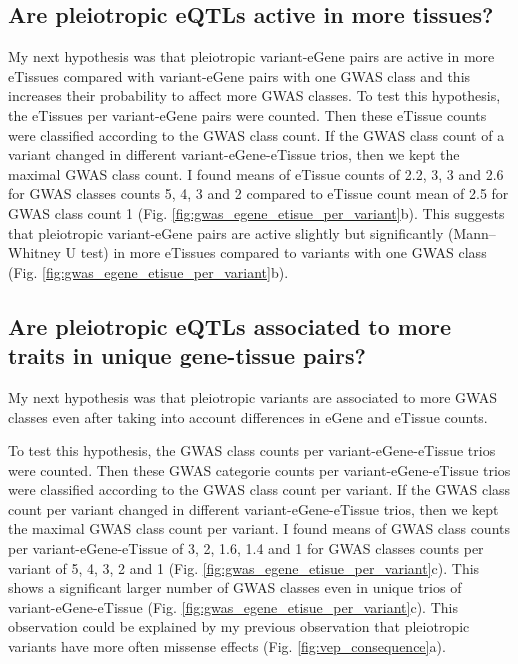 \subsection*{Are pleiotropic eQTLs active in more tissues?}

My next hypothesis was that pleiotropic variant-eGene pairs are active in more eTissues compared with variant-eGene pairs with one GWAS class and this increases their probability to affect more GWAS classes.
%
To test this hypothesis, the eTissues per variant-eGene pairs were counted.
%
Then these eTissue counts were classified according to the GWAS class count.
%
If the GWAS class count of a variant changed in different variant-eGene-eTissue trios, then we kept the maximal GWAS class count.
%
I found means of eTissue counts of 2.2, 3, 3 and 2.6 for GWAS classes counts 5, 4, 3 and 2 compared to eTissue count mean of 2.5 for GWAS class count 1 (Fig. \ref{fig:gwas_egene_etisue_per_variant}b).
%
This suggests that pleiotropic variant-eGene pairs are active slightly but significantly (Mann–Whitney U test) in more eTissues compared to variants with one GWAS class (Fig. \ref{fig:gwas_egene_etisue_per_variant}b).

\subsection*{Are pleiotropic eQTLs associated to more traits in unique gene-tissue pairs?}

My next hypothesis was that pleiotropic variants are associated to more GWAS classes even after taking into account differences in eGene and eTissue counts.

To test this hypothesis, the GWAS class counts per variant-eGene-eTissue trios were counted.
%
Then these GWAS categorie counts per variant-eGene-eTissue trios were classified according to the GWAS class count per variant.
%
If the GWAS class count per variant changed in different variant-eGene-eTissue trios, then we kept the maximal GWAS class count per variant.
%
I found means of GWAS class counts per variant-eGene-eTissue of 3, 2, 1.6, 1.4 and 1 for GWAS classes counts per variant of 5, 4, 3, 2 and 1 (Fig. \ref{fig:gwas_egene_etisue_per_variant}c).
%
This shows a significant larger number of GWAS classes even in unique trios of variant-eGene-eTissue (Fig. \ref{fig:gwas_egene_etisue_per_variant}c).
%
This observation could be explained by my previous observation that pleiotropic variants have more often missense effects (Fig. \ref{fig:vep_consequence}a).

